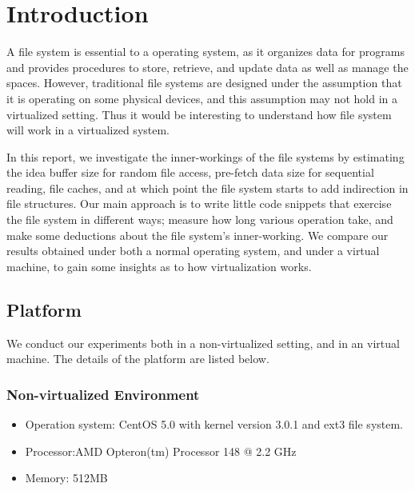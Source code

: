 \section{Introduction}
\label{section:intro}

A file system is essential to a operating system, as it organizes data for programs and provides procedures to store, retrieve, and update data as well as manage the spaces. However, traditional file systems are designed under the assumption that it is operating on some physical devices, and this assumption may not hold in a virtualized setting. Thus it would be interesting to understand how file system will work in a virtualized system.

In this report, we investigate the inner-workings of the file systems by estimating the idea buffer size for random file access, pre-fetch data size for sequential reading, file caches, and at which point the file system starts to add indirection in file structures. Our main approach is to write little code snippets that exercise the file system in different ways; measure how long various operation take, and make some deductions about the file system's inner-working. We compare our results obtained under both a normal operating system, and under a virtual machine, to gain some insights as to how virtualization works.  

\subsection{Platform}
\label{subsection:platform}

We conduct our experiments both in a non-virtualized setting, and in an virtual machine. The details of the platform are listed below.

\subsubsection{Non-virtualized Environment}
\begin{itemize}
\item{}
Operation system: CentOS 5.0 with kernel version 3.0.1 and ext3 file system. 
\item{}
Processor:AMD Opteron(tm) Processor 148 @ 2.2 GHz
\item{}
Memory: 512MB
\end{itemize}

